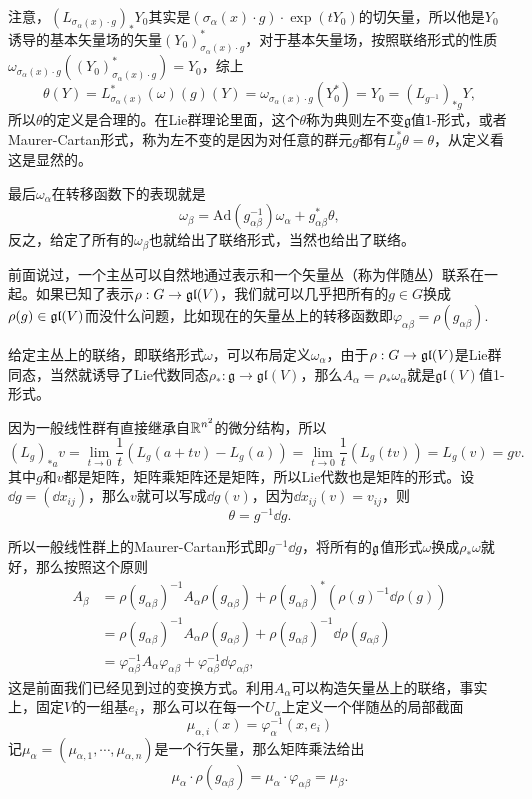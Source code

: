注意，$\left(L_{\sigma_\alpha(x)\cdot g}\right)_*Y_0$其实是$(\sigma_\alpha(x)\cdot g)\cdot \exp{(tY_0)}$的切矢量，所以他是$Y_0$诱导的基本矢量场的矢量$(Y_0)^*_{\sigma_\alpha(x)\cdot g}$，对于基本矢量场，按照联络形式的性质$\omega_{\sigma_\alpha(x)\cdot g}\left((Y_0)^*_{\sigma_\alpha(x)\cdot g}\right)=Y_0$，综上
\[
	\theta(Y)=L_{\sigma_\alpha(x)}^*(\omega)(g)(Y)=\omega_{\sigma_\alpha(x)\cdot g}(Y_0^*)=Y_0=\left(L_{g^{-1}}\right)_{*g}Y,
\]
所以$\theta$的定义是合理的。在Lie群理论里面，这个$\theta$称为典则左不变$\mathfrak{g}$值1-形式，或者Maurer-Cartan形式，称为左不变的是因为对任意的群元$g$都有$L_g^{*}\theta=\theta$，从定义看这是显然的。

最后$\omega_\alpha$在转移函数下的表现就是
\[
	\omega_\beta=\mathrm{Ad}(g_{\alpha\beta}^{-1})\omega_\alpha+g_{\alpha\beta}^*\theta,
\]
反之，给定了所有的$\omega_\beta$也就给出了联络形式，当然也给出了联络。

前面说过，一个主丛可以自然地通过表示和一个矢量丛（称为伴随丛）联系在一起。如果已知了表示$\rho:G\to \mathfrak{gl}(V)$，我们就可以几乎把所有的$g\in G$换成$\rho(g)\in \mathfrak{gl}(V)$而没什么问题，比如现在的矢量丛上的转移函数即$\varphi_{\alpha\beta}=\rho(g_{\alpha\beta})$.

给定主丛上的联络，即联络形式$\omega$，可以布局定义$\omega_\alpha$，由于$\rho:G\to \mathfrak{gl}(V)$是Lie群同态，当然就诱导了Lie代数同态$\rho_*:\mathfrak{g}\to \mathfrak{gl}(V)$，那么$A_\alpha=\rho_*\omega_\alpha$就是$\mathfrak{gl}(V)$值1-形式。

因为一般线性群有直接继承自$\mathbb{R}^{n^2}$的微分结构，所以
\[
	(L_g)_{*a}v=\lim_{t\to 0}\frac{1}{t}(L_g(a+tv)-L_g(a))=\lim_{t\to 0}\frac{1}{t}(L_g(tv))=L_g(v)=gv.
\]
其中$g$和$v$都是矩阵，矩阵乘矩阵还是矩阵，所以Lie代数也是矩阵的形式。设$\dd g=(\dd x_{ij})$，那么$v$就可以写成$\dd g(v)$，因为$\dd x_{ij}(v)=v_{ij}$，则
\[
	\theta=g^{-1}\dd g.
\]

所以一般线性群上的Maurer-Cartan形式即$g^{-1}\dd g$，将所有的${\mathfrak{g}}$值形式$\omega$换成$\rho_*\omega$就好，那么按照这个原则
\begin{align*}
	A_\beta&=\rho(g_{\alpha\beta})^{-1}A_\alpha\rho(g_{\alpha\beta})+\rho(g_{\alpha\beta})^*\left(\rho(g)^{-1}\dd \rho(g)\right)\\
	&=\rho(g_{\alpha\beta})^{-1}A_\alpha\rho(g_{\alpha\beta})+\rho(g_{\alpha\beta})^{-1}\dd \rho(g_{\alpha\beta})\\
	&=\varphi_{\alpha\beta}^{-1}A_\alpha\varphi_{\alpha\beta}+\varphi_{\alpha\beta}^{-1}\dd \varphi_{\alpha\beta},
\end{align*}
这是前面我们已经见到过的变换方式。利用$A_\alpha$可以构造矢量丛上的联络，事实上，固定$V$的一组基$e_i$，那么可以在每一个$U_\alpha$上定义一个伴随丛的局部截面
\[
	\mu_{\alpha,i}(x)=\varphi_\alpha^{-1}(x,e_i)
\]
记$\mu_\alpha=(\mu_{\alpha,1},\cdots,\mu_{\alpha,n})$是一个行矢量，那么矩阵乘法给出
\[
	\mu_\alpha\cdot \rho(g_{\alpha\beta})=\mu_\alpha\cdot \varphi_{\alpha\beta}=\mu_\beta.
\]

